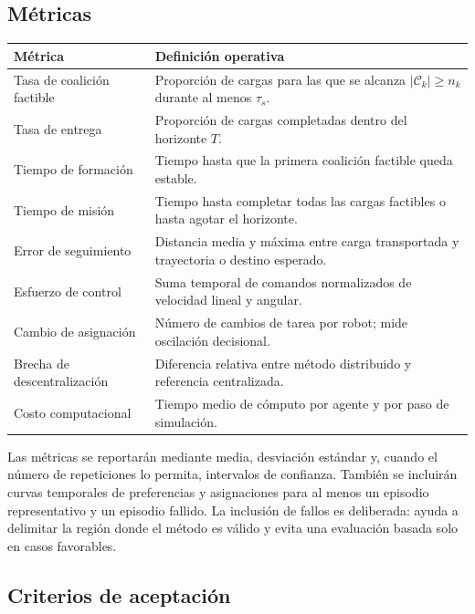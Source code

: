 \documentclass[11pt,a4paper]{article}
\begin{document}
\subsection{Métricas}

\begin{center}
\small
\begin{tabular}{p{4.2cm}p{9.5cm}}
\toprule
\textbf{Métrica} & \textbf{Definición operativa} \\
\midrule
Tasa de coalición factible & Proporción de cargas para las que se alcanza $|\mathcal{C}_k|\geq n_k$ durante al menos $\tau_s$. \\
Tasa de entrega & Proporción de cargas completadas dentro del horizonte $T$. \\
Tiempo de formación & Tiempo hasta que la primera coalición factible queda estable. \\
Tiempo de misión & Tiempo hasta completar todas las cargas factibles o hasta agotar el horizonte. \\
Error de seguimiento & Distancia media y máxima entre carga transportada y trayectoria o destino esperado. \\
Esfuerzo de control & Suma temporal de comandos normalizados de velocidad lineal y angular. \\
Cambio de asignación & Número de cambios de tarea por robot; mide oscilación decisional. \\
Brecha de descentralización & Diferencia relativa entre método distribuido y referencia centralizada. \\
Costo computacional & Tiempo medio de cómputo por agente y por paso de simulación. \\
\bottomrule
\end{tabular}
\end{center}

Las métricas se reportarán mediante media, desviación estándar y, cuando el número de repeticiones lo permita, intervalos de confianza. También se incluirán curvas temporales de preferencias y asignaciones para al menos un episodio representativo y un episodio fallido. La inclusión de fallos es deliberada: ayuda a delimitar la región donde el método es válido y evita una evaluación basada solo en casos favorables.

\subsection{Criterios de aceptación}
\end{document}
